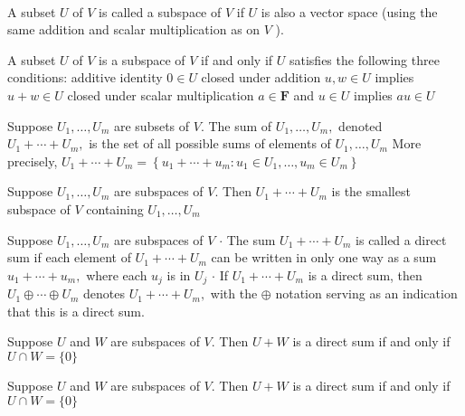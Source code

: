  \\

A subset $U$ of $V$ is called a subspace of $V$ if $U$ is also a vector space (using the same addition and scalar multiplication as on $V$ ).

A subset $U$ of $V$ is a subspace of $V$ if and only if $U$ satisfies the following three conditions:
additive identity
$0 \in U$
closed under addition $u, w \in U$ implies $u+w \in U$
closed under scalar multiplication
$a \in \mathbf{F}$ and $u \in U$ implies $a u \in U$

Suppose $U_{1}, \ldots, U_{m}$ are subsets of $V .$ The sum of $U_{1}, \ldots, U_{m},$ denoted $U_{1}+\cdots+U_{m},$ is the set of all possible sums of elements of $U_{1}, \ldots, U_{m}$ More precisely,
$
U_{1}+\cdots+U_{m}=\left\{u_{1}+\cdots+u_{m}: u_{1} \in U_{1}, \ldots, u_{m} \in U_{m}\right\}
$

Suppose $U_{1}, \ldots, U_{m}$ are subspaces of $V .$ Then $U_{1}+\cdots+U_{m}$ is the smallest subspace of $V$ containing $U_{1}, \ldots, U_{m}$

Suppose $U_{1}, \ldots, U_{m}$ are subspaces of $V$
$\cdot$ The sum $U_{1}+\cdots+U_{m}$ is called a direct sum if each element of $U_{1}+\cdots+U_{m}$ can be written in only one way as a sum $u_{1}+\cdots+u_{m},$ where each $u_{j}$ is in $U_{j}$
$\cdot$ If $U_{1}+\cdots+U_{m}$ is a direct sum, then $U_{1} \oplus \cdots \oplus U_{m}$ denotes $U_{1}+\cdots+U_{m},$ with the $\oplus$ notation serving as an indication that this is a direct sum.

Suppose $U$ and $W$ are subspaces of $V .$ Then $U+W$ is a direct sum if and only if $U \cap W=\{0\}$

Suppose $U$ and $W$ are subspaces of $V .$ Then $U+W$ is a direct sum if and only if $U \cap W=\{0\}$
